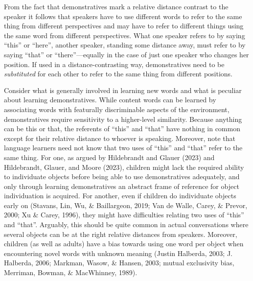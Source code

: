 \documentclass[
  man,floatsintext]{apa6}
\begin{document}
From the fact that demonstratives mark a relative distance contrast to the speaker it follows that speakers have to use different words to refer to the same thing from different perspectives and may have to refer to different things using the same word from different perspectives. What one speaker refers to by saying ``this'' or ``here'', another speaker, standing some distance away, must refer to by saying ``that'' or ``there''---equally in the case of just one speaker who changes her position. If used in a distance-contrasting way, demonstratives need to be \emph{substituted} for each other to refer to the same thing from different positions.

Consider what is generally involved in learning new words and what is peculiar about learning demonstratives. While content words can be learned by associating words with featurally discriminable aspects of the environment, demonstratives require sensitivity to a higher-level similarity. Because anything can be this or that, the referents of ``this'' and ``that'' have nothing in common except for their relative distance to whoever is speaking. Moreover, note that language learners need not know that two uses of ``this'' and ``that'' refer to the same thing. For one, as argued by Hildebrandt and Glauer (2023) and Hildebrandt, Glauer, and Moore (2023), children might lack the required ability to individuate objects before being able to use demonstratives adequately, and only through learning demonstratives an abstract frame of reference for object individuation is acquired. For another, even if children do individuate objects early on (Stavans, Lin, Wu, \& Baillargeon, 2019; Van de Walle, Carey, \& Prevor, 2000; Xu \& Carey, 1996), they might have difficulties relating two uses of ``this'' and ``that''. Arguably, this should be quite common in actual conversations where several objects can be at the right relative distances from speakers. Moreover, children (as well as adults) have a bias towards using one word per object when encountering novel words with unknown meaning (Justin Halberda, 2003; J. Halberda, 2006; Markman, Wasow, \& Hansen, 2003; mutual exclusivity bias, Merriman, Bowman, \& MacWhinney, 1989).
\end{document}
